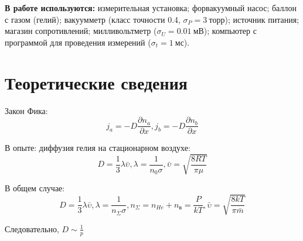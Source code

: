 \documentclass[a4paper,12pt]{article}
\begin{document}
    \textbf{В работе используются:} измерительная установка; форвакуумный насос; баллон с газом  (гелий); вакуумметр (класс точности 0.4, $\sigma_P = 3~торр$); источник питания; магазин сопротивлений; милливольтметр ($\sigma_U = 0.01~мВ$); компьютер с программой для проведения измерений ($\sigma_t = 1~мс$).


\section{Теоретические сведения}
    Закон Фика:
\begin{equation}
    j_a=-D\frac{\partial n_a}{\partial x}, j_b=-D\frac{\partial n_b}{\partial x}
\end{equation}

    В опыте: диффузия гелия на стационарном воздухе:
\begin{equation}
    D=\frac{1}{3}\lambda \bar{\upsilon}, \lambda = \frac{1}{n_0\sigma}, \bar{\upsilon} = \sqrt{\frac{8RT}{\pi \mu}}
\end{equation}

    В общем случае:
\begin{equation}
    D = \frac{1}{3}\lambda \bar{\upsilon}, \lambda = \frac{1}{n_{\Sigma}\sigma}, n_{\Sigma} = n_{He}+n_{\text{в}}=\frac{P}{kT}, \bar{\upsilon} = \sqrt{\frac{8kT}{\pi \bar{m}}}
\end{equation}

    Следовательно, $D\sim \frac{1}{p}$
\end{document}
